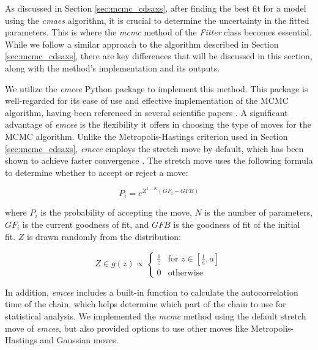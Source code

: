 As discussed in Section \ref{sec:mcmc_cdsaxs}, after finding the best fit for a model using the \textit{cmaes} algorithm, it is crucial 
to determine the uncertainty in the fitted parameters. This is where the \textit{mcmc} method of the \textit{Fitter} class becomes essential. 
While we follow a similar approach to the algorithm described in Section \ref{sec:mcmc_cdsaxs}, there are key differences that will be discussed 
in this section, along with the method's implementation and its outputs.

\medskip

We utilize the \textit{emcee} Python package \cite{emcee} to implement this method. This package is well-regarded for its ease 
of use and effective implementation of the MCMC algorithm, having been referenced in several scientific papers \cite{emcee_refed}. 
A significant advantage of \textit{emcee} is the flexibility it offers in choosing the type of moves for the MCMC algorithm. Unlike 
the Metropolis-Hastings criterion used in Section \ref{sec:mcmc_cdsaxs}, \textit{emcee} employs the stretch move by default, which 
has been shown to achieve faster convergence \cite{goodman2010_strech_move,emcee}. The stretch move uses the following formula to 
determine whether to accept or reject a move:

\begin{equation}
    P_{i} = e^{Z^{1-N} (GF_{i} -GFB)}
\end{equation}

where \(P_{i}\) is the probability of accepting the move, \(N\) is the number of parameters, \(GF_{i}\) is the current goodness of fit, 
and \(GFB\) is the goodness of fit of the initial fit. \(Z\) is drawn randomly from the distribution:

\begin{equation}
    Z \in g(z) \propto 
    \begin{cases} 
      \frac{1}{z} & \text{for } z \in \left[\frac{1}{a}, a\right] \\
      0 & \text{otherwise}
    \end{cases}
\end{equation}

\medskip

In addition, \textit{emcee} includes a built-in function to calculate the autocorrelation time of the chain, which helps determine which part of the chain to use for statistical analysis. We implemented the \textit{mcmc} method using the default stretch move of \textit{emcee}, but also provided options to use other moves like Metropolis-Hastings and Gaussian moves.

